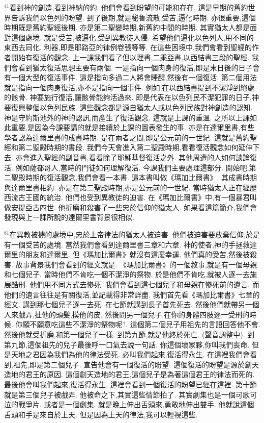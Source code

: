 \documentclass{book}
\begin{document}
$^{41}$看到神的創造,看到神納的約.
他們會看到盼望的可能和存在.
這是早期的舊約世界告訴我們以色列的盼望.
到了後期,就是秘魯流散,受苦,逼化時期.
亦很重要,這個時期既是舊約聖經後期.
亦是第二聖變時期,新舊約中間的時期.
其實猶太人都是面對這個處境.
就是受苦,被逼化,受到異教徒入侵.
希望他們逼化以色列人,用不同的東西去同化.
利器,即是耶路亞的律例卷張等等.
在這些困境中,我們會看到聖經的作者開始有復活的觀念.
上一課我們看了但以理書,二乘亞書,以西結書三段的聖經.
我們會看到猶太復活思想主要有兩個.
一是指向一個肉身的復活,即是末日後的日子會有一個大型的復活事件.
這是指向多過二人將會睡醒,然後有一個復活.
第二個用法就是指向一個肉身復活,亦不是指向一個事件.
例如,在以西結書提到不潔淨到絕處的骸骨.
神要施行復活,讓骸骨能夠活過來.
即是代表在以色列民不潔犯罪的日子,神要復興整個以色列民族.
這些觀念都是源自猶太人或以色列民族對神創造的認知.
神是守約斯池外的神的認訊,而產生了復活觀念.
這就是上課的重溫.
之所以上課如此重要,是因為今課要講的就是接續於上課的圖表發生的事.
亦是在達爾里書,有些學者認為達爾里書的成書時期.
是在兩者之間,即是公元前的一世紀.
這就是舊約聖經和第二聖殿時期的書段.
我們今天會進入第二聖殿時期,看看復活觀念如何延伸下去.
亦會進入聖經的副音書,看看除了耶穌基督復活之外.
其他周遭的人如何談論復活.
例如薩都哥人,當時的門徒如何理解復活.
今課我們主要處理這部分.
開始吧,第二聖殿時期的復活觀念,我們會看一本書.
這本書叫做《瑪加比爾書》.
其成書時期與達爾里書相約.
亦是在第二聖殿時期,亦是公元前的一世紀.
當時猶太人正在經歷西流古王國的統治.
他們也受到異教徒的迫害.
在《瑪加比爾書》中,有一個暴君叫做安提亞古四世.
他折磨和殺害了一些忠於信仰的猶太人.
如果看這篇簡介,我們會發現與上一課所說的達爾里書背景很相似.

$^{81}$在異教被擄的處境中,忠於上帝律法的猶太人被迫害.
他們被迫害要放棄信仰,於是有一個受苦的處境.
當然我們會看到達爾里書三章和六章.
神的使者,神的手拯救達爾里的朋友和達爾里.
但《瑪加比爾書》就沒有這麼幸運.
他們真的受苦,然後被殺害.
故事背景我們會看到的經文就是.
《瑪加比爾書》的一個敘事,就是有一個母親和七個兒子.
當時他們不肯吃一個不潔淨的祭物.
於是他們不肯吃,就被人逐一去施展酷刑.
他們用不同方式去慘死.
我們會看到這七個兒子和母親在慘死前的遺言.
而他們的遺言往往是有關復活,並記載得非常詳盡.
我們首先看《瑪加比爾書》七章的經文.
講到那七個兒子逐一去死.
在七節就講到長子首先死去.
然後他們就帶另一個人來戲弄,扯他的頭髮,摸他的皮.
然後問另一個兒子,在你的身體四肢逐一受刑的時候.
你願不願意吃這些不潔淨的祭物呢?.
這個第二個兒子用祖先的言語回答他不會.
然後他就受折磨,和第一個兒子一樣.
到第九節,就是他終於死亡.
(聲音調整中).
到第九節,這個祖先的兒子最後呼一口氣去說一句話.
你這個壞家夥,你叫我們喪命.
但是天地之君因為我們為他的律法受死.
必叫我們起來,復活得永生.
在這裡我們會看到,祖先,即是第二個兒子.
宣告他會有一個復活的盼望.
這個復活的盼望是源於創天造地的君王的原因.
這個創天造地的君王,這個兒子是為著這個君王的律法而死的.
最後他會叫我們起來,復活得永生.
這裡會看到一個復活的盼望已經在這裡.
第十節就是第三個兒子被戲弄.
他被命之下,其實這些情節拍了.
其實劇集也是一個可歌可泣的戰爭片.
或者是一個劇集.
就是晚上伸出舌頭來,勇敢地伸出雙手.
他就說這個舌頭和手是來自於上天.
但是因為上天的律法,我可以輕視這些.
\end{document}
